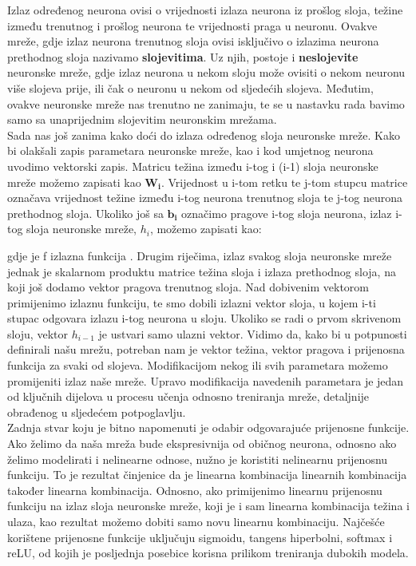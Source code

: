 \noindent Izlaz određenog neurona ovisi o vrijednosti izlaza neurona iz prošlog sloja, težine između trenutnog i prošlog neurona te vrijednosti praga u neuronu. Ovakve mreže, gdje izlaz neurona trenutnog sloja ovisi isključivo o izlazima neurona prethodnog sloja nazivamo \textbf{slojevitima}. Uz njih, postoje i \textbf{neslojevite} neuronske mreže, gdje izlaz neurona u nekom sloju može ovisiti o nekom neuronu više slojeva prije, ili čak o neuronu u nekom od sljedećih slojeva. Međutim, ovakve neuronske mreže nas trenutno ne zanimaju, te se u nastavku rada bavimo samo sa unaprijednim slojevitim neuronskim mrežama. \\

\noindent Sada nas još zanima kako doći do izlaza određenog sloja neuronske mreže. Kako bi olakšali zapis parametara neuronske mreže, kao i kod umjetnog neurona uvodimo vektorski zapis.
Matricu težina između i-tog i (i-1) sloja neuronske mreže možemo zapisati kao $\mathbf{W_{i}}$. Vrijednost u i-tom retku te j-tom stupcu matrice označava vrijednost težine između i-tog neurona trenutnog sloja te j-tog neurona prethodnog sloja. Ukoliko još sa $\mathbf{b_{i}}$ označimo pragove i-tog sloja neurona, izlaz i-tog sloja neuronske mreže, $h_{i}$, možemo zapisati kao:

\begin{myequation}%
\end{myequation}

\noindent gdje je f izlazna funkcija \citep{uilectures}. Drugim riječima, izlaz svakog sloja neuronske mreže jednak je skalarnom produktu matrice težina sloja i izlaza prethodnog sloja, na koji još dodamo vektor pragova trenutnog sloja. Nad dobivenim vektorom primijenimo izlaznu funkciju, te smo dobili izlazni vektor sloja, u kojem i-ti stupac odgovara izlazu i-tog neurona u sloju. Ukoliko se radi o prvom skrivenom sloju, vektor $h_{i-1}$ je ustvari samo ulazni vektor. Vidimo da, kako bi u potpunosti definirali našu mrežu, potreban nam je vektor težina, vektor pragova i prijenosna funkcija za svaki od slojeva. Modifikacijom nekog ili svih parametara možemo promijeniti izlaz naše mreže. Upravo modifikacija navedenih parametara je jedan od ključnih dijelova u procesu učenja odnosno treniranja mreže, detaljnije obrađenog u sljedećem potpoglavlju.\\

\noindent Zadnja stvar koju je bitno napomenuti je odabir odgovarajuće prijenosne funkcije. Ako želimo da naša mreža bude ekspresivnija od običnog neurona, odnosno ako želimo modelirati i nelinearne odnose, nužno je koristiti nelinearnu prijenosnu funkciju. To je rezultat činjenice da je linearna kombinacija linearnih kombinacija također linearna kombinacija. Odnosno, ako primijenimo linearnu prijenosnu funkciju na izlaz sloja neuronske mreže, koji je i sam linearna kombinacija težina i ulaza, kao rezultat možemo dobiti samo novu linearnu kombinaciju. Najčešće korištene prijenosne funkcije uključuju sigmoidu, tangens hiperbolni, softmax i reLU, od kojih je posljednja posebice korisna prilikom treniranja dubokih modela.\citep{uilectures} 



